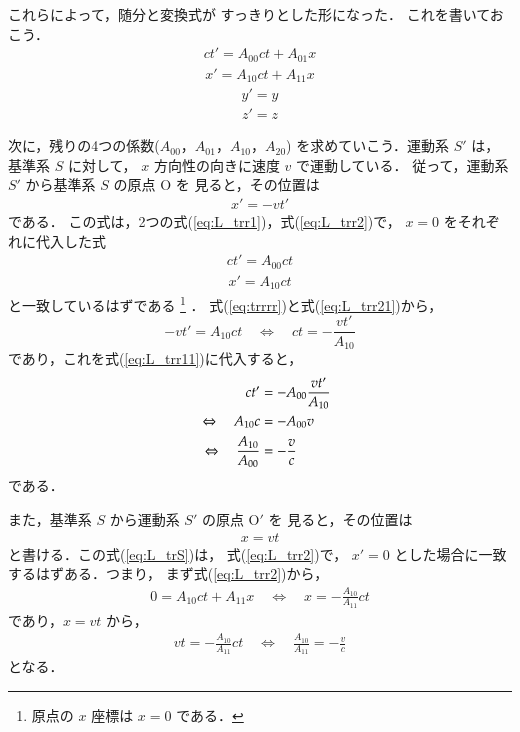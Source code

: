 これらによって，随分と変換式が
すっきりとした形になった．
これを書いておこう．
\begin{align}\label{eq:L_trr1}
ct'=A_{00}ct+A_{01}x
\end{align}
\begin{align}\label{eq:L_trr2}
x'=A_{10}ct+A_{11}x
\end{align}
\begin{align}\label{eq:L_trr3}
y'=y
\end{align}
\begin{align}\label{eq:L_trr4}
z'=z
\end{align}










次に，残りの4つの係数($A_{00}$，$A_{01}$，$A_{10}$，$A_{20}$)
を求めていこう．運動系 $S'$ は，基準系 $S$ に対して，
$x$ 方向性の向きに速度 $v$ で運動している．
従って，運動系 $S'$ から基準系 $S$ の原点 O を
見ると，その位置は
\begin{align}\label{eq:trrrr}
x'=-vt'
\end{align}
である．
この式は，2つの式(\ref{eq:L_trr1})，式(\ref{eq:L_trr2})で，
$x=0$ をそれぞれに代入した式
\begin{align}\label{eq:L_trr11}
ct'=A_{00}ct
\end{align}
\begin{align}\label{eq:L_trr21}
x'=A_{10}ct
\end{align}
と一致しているはずである
\footnote{
原点の $x$ 座標は $x=0$ である．
}
．
式(\ref{eq:trrrr})と式(\ref{eq:L_trr21})から，
\begin{equation*}
-vt'=A_{10}ct
\quad\Leftrightarrow\quad
ct=-\frac{vt'}{A_{10}}
\end{equation*}
であり，これを式(\ref{eq:L_trr11})に代入すると，
\begin{align}\label{eq:L_trr111}
ct'&=-A_{00}\frac{vt'}{A_{10}} \notag \\
\quad\Leftrightarrow\quad  A_{10}c&=-A_{00}v \notag \\
\quad\Leftrightarrow\quad \frac{A_{10}}{A_{00}}&=-\frac{v}{c}
\end{align}
である．

また，基準系 $S$ から運動系 $S'$ の原点 O$'$ を
見ると，その位置は
\begin{align}\label{eq:L_trS}
x=vt
\end{align}
と書ける．この式(\ref{eq:L_trS})は，
式(\ref{eq:L_trr2})で，
$x'=0$ とした場合に一致するはずある．つまり，
まず式(\ref{eq:L_trr2})から，
\begin{align}
0=A_{10}ct+A_{11}x
\quad\Leftrightarrow\quad
x=-\frac{A_{10}}{A_{11}}ct
\end{align}
であり，$x=vt$ から，
\begin{align}\label{eq:L_trr222}
vt=-\frac{A_{10}}{A_{11}}ct
\quad\Leftrightarrow\quad
\frac{A_{10}}{A_{11}}=-\frac{v}{c}
\end{align}
となる．

